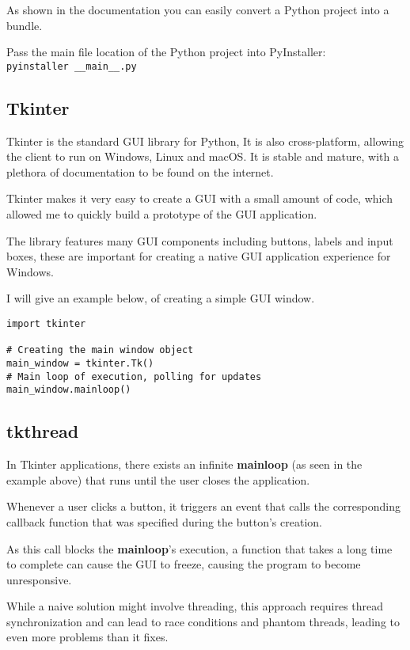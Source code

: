 As shown in the documentation you can easily
convert a Python project into a bundle. \cite{pyinstaller}

Pass the main file location of the Python project into PyInstaller: \\
\texttt{pyinstaller \_\_main\_\_.py}

\subsection{Tkinter}
Tkinter is the standard GUI library for Python,
It is also cross-platform, allowing the client to run on Windows, Linux and macOS.
It is stable and mature, with a plethora of documentation to be found on the internet.

Tkinter makes it very easy to create a GUI with a small amount of code,
which allowed me to quickly build a prototype of the GUI application.

The library features many GUI components including buttons, labels and input boxes,
these are important for creating a native GUI application experience for Windows.

I will give an example below, of creating a simple GUI window.

\begin{lstlisting}
import tkinter

# Creating the main window object
main_window = tkinter.Tk()
# Main loop of execution, polling for updates
main_window.mainloop()
\end{lstlisting}

\subsection{tkthread}
In Tkinter applications, there exists an infinite \textbf{mainloop}
(as seen in the example above)
that runs until the user closes the application.

Whenever a user clicks a button,
it triggers an event that calls the corresponding callback function
that was specified during the button's creation.

As this call blocks the \textbf{mainloop}'s execution,
a function that takes a long time to complete can cause the GUI to freeze,
causing the program to become unresponsive.

While a naive solution might involve threading,
this approach requires thread synchronization and can lead to race conditions
and phantom threads, leading to even more problems than it fixes.


